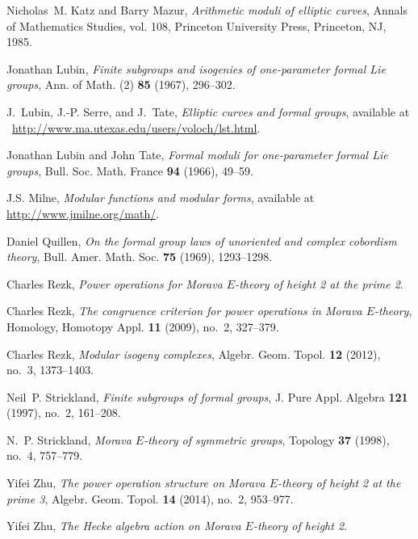 \documentclass{gtpart}
\theoremstyle{definition}
\theoremstyle{remark}
\renewcommand{\=}{\approx}
\renewcommand{\-}{\sim}
\numberwithin{equation}{section}
\begin{document}
\begin{thebibliography}
Nicholas~M. Katz and Barry Mazur, \emph{Arithmetic moduli of elliptic curves},
  Annals of Mathematics Studies, vol. 108, Princeton University Press,
  Princeton, NJ, 1985. 

Jonathan Lubin, \emph{Finite subgroups and isogenies of one-parameter formal
  {L}ie groups}, Ann. of Math. (2) \textbf{85} (1967), 296--302. 

J.~Lubin, J.-P. Serre, and J.~Tate, \emph{Elliptic curves and formal groups},
  available at \,\! \href{http://www.ma.utexas.edu/users/voloch/lst.html}
  {http://www.ma.utexas.edu/users/voloch/lst.html}.

Jonathan Lubin and John Tate, \emph{Formal moduli for one-parameter formal
  {L}ie groups}, Bull. Soc. Math. France \textbf{94} (1966), 49--59.

J.S. Milne, \emph{Modular functions and modular forms}, available at \\
  \href{http://www.jmilne.org/math/CourseNotes/MF.pdf}
  {http://www.jmilne.org/math/}.

Daniel Quillen, \emph{On the formal group laws of unoriented and complex
  cobordism theory}, Bull. Amer. Math. Soc. \textbf{75} (1969), 1293--1298.

Charles Rezk, \emph{Power operations for {M}orava {$E$}-theory of height 2 at 
  the prime 2}. 

Charles Rezk, \emph{The congruence criterion for power operations in {M}orava
  {$E$}-theory}, Homology, Homotopy Appl. \textbf{11} (2009), no.~2, 327--379.

Charles Rezk, \emph{Modular isogeny complexes}, Algebr. Geom. Topol. \textbf{12}
  (2012), no.~3, 1373--1403. 

Neil~P. Strickland, \emph{Finite subgroups of formal groups}, J. Pure Appl.
  Algebra \textbf{121} (1997), no.~2, 161--208. 

N.~P. Strickland, \emph{Morava {$E$}-theory of symmetric groups}, Topology
  \textbf{37} (1998), no.~4, 757--779. 

Yifei Zhu, \emph{The power operation structure on {M}orava {$E$}-theory of
  height 2 at the prime 3}, Algebr. Geom. Topol. \textbf{14} (2014), no.~2,
  953--977. 

Yifei Zhu, \emph{The {H}ecke algebra action on {M}orava {$E$}-theory of height
  2}. 

\end{thebibliography}
\end{document}
